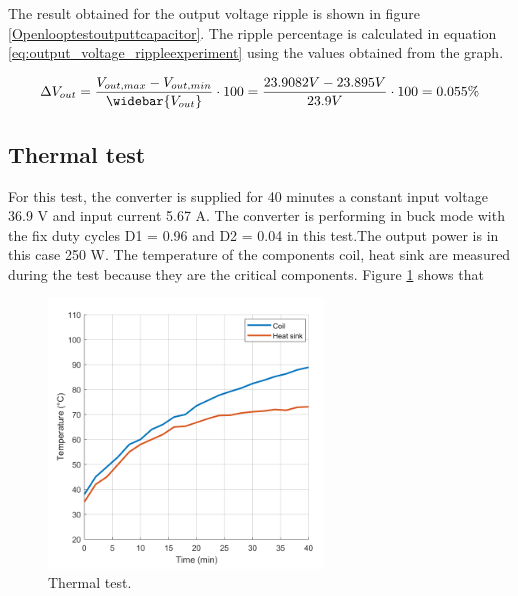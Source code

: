 The result obtained for the output voltage ripple is shown in figure \ref{Openlooptestoutputtcapacitor}. The ripple percentage is calculated in equation \ref{eq:output_voltage_rippleexperiment} using the values obtained from the graph. 

\begin{equation} \label{eq:output_voltage_rippleexperiment}
\Delta V_{out} = \frac{V_{out,max}-V_{out,min}}{\widebar{V_{out}}} \cdot 100 = \frac{23.9082V - 23.895V }{23.9V} \cdot 100 = 0.055\%
\end{equation}


\subsection{Thermal test}

For this test, the converter is supplied for 40 minutes a constant input voltage 36.9 V and input current 5.67 A. The converter is performing in buck mode with the fix duty cycles D1 = 0.96 and D2 = 0.04 in this test.The output power is in this case 250 W. The temperature of the components coil, heat sink are measured during the test because they are the critical components. Figure \ref{Testthermal} shows that 

\begin{figure}[H]
	\begin{center}
		\includegraphics[width=0.65\textwidth]{../Pictures/P1/Test/Thermal_test_with_heat_sink}
		\caption{Thermal test.}
		\label{Testthermal}
	\end{center}	
\end{figure}

